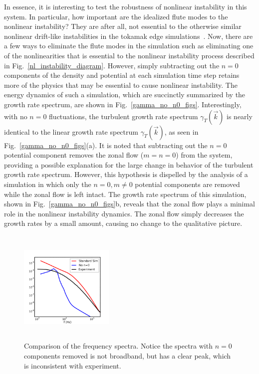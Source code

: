 \documentclass[showpacs,preprintnumbers,amsmath,amssymb,superscriptaddress]{revtex4}
\begin{document}
In essence, it is interesting to test the robustness of nonlinear instability in this system. In particular, how important are the idealized flute modes to the nonlinear instability?
They are after all, not essential to the otherwise similar nonlinear drift-like instabilities in the tokamak edge simulations~\cite{zeiler1996,zeiler1997,scott2002,scott2003,scott2005}.
Now, there are a few ways to eliminate the flute modes in the simulation such as
eliminating one of the nonlinearities that is essential to the nonlinear instability process described in Fig.~\ref{nl_instability_diagram}. However, simply subtracting out the $n=0$
components of the density and potential at each simulation time step retains more of the physics that may be essential to cause nonlinear instability. The energy dynamics of such a simulation,
which are succinctly summarized by the growth rate spectrum,
are shown in Fig.~\ref{gamma_no_n0_figs}. Interestingly, with no $n=0$
fluctuations, the turbulent growth rate spectrum $\gamma_T(\vec{k})$ is nearly identical to the linear growth rate spectrum $\gamma_T(\vec{k})$, as seen in
Fig.~\ref{gamma_no_n0_figs}(a). It is noted that subtracting out the $n=0$ potential component removes the zonal flow ($m=n=0$) from the system, providing a possible explanation for the large change
in behavior of the turbulent growth rate spectrum. However, this hypothesis is dispelled by the analysis of a simulation in which only the $n=0, m \ne 0$ potential components are removed while 
the zonal flow is left intact. The growth rate spectrum of this simulation, shown in Fig.~\ref{gamma_no_n0_figs}b, reveals that the zonal flow plays a minimal role in the nonlinear instability
dynamics. The zonal flow simply decreases the growth rates by a small amount, causing no change to the qualitative picture. 

\begin{figure}[!htbp]
\includegraphics[width=0.40\textwidth,height=55mm]{fspec_3}
\hfil
\caption{Comparison of the frequency spectra. Notice the spectra with $n=0$ components removed is not broadband, but has a clear peak, which is inconsistent with experiment.}
\label{freq_spectra3}
\end{figure}
\end{document}
